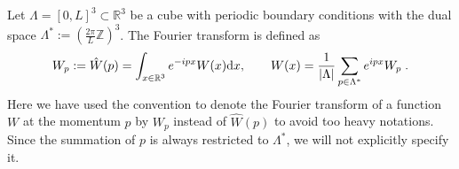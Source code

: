 \documentclass[11pt]{article}
\numberwithin{equation}{section}
\newcommand{\e}{\varepsilon}
\newcommand{\rd}{{\rm d}}
\newcommand{\wh}{\widehat}
\newcommand{\ann}{a^{\hphantom{+}}}
\newcommand{\cre}{a^{\dagger}}
\newcommand\Z{{\mathbb Z}}
\newcommand\R{{\mathbb R}}
\theoremstyle{definition}
\begin{document}
Let  $\Lambda= [0,L]^3\subset \R^3$ be a cube 
with periodic boundary conditions with the dual space  
$\Lambda^*:= (\frac{2\pi}{L} \Z)^3$. 
The Fourier transform is defined as
$$
      W_p:= \hat W(p)  = \int_{x\in \R^3} e^{-ipx} W(x) \rd x, \qquad
     W(x) = \frac{1}{|\Lambda|} \sum_{p\in \Lambda^*}e^{ipx}  W_p \; .
$$ 
Here we have used the convention to denote the Fourier transform of a function $W$ at the momentum $p$ by $W_p$ 
instead of $\wh W (p)$  to avoid too heavy notations. 
%
Since the summation of $p$ is always restricted to $\Lambda^*$, we will  not explicitly specify it. 
%

%

%
%
\end{document}
